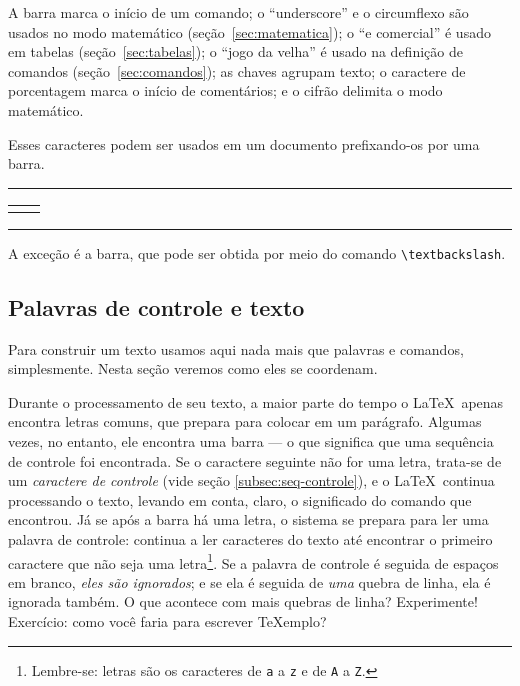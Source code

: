 A barra marca o início de um comando; o ``underscore'' e o circumflexo
são usados no modo matemático (seção~\ref{sec:matematica}); o ``e
comercial'' é usado em tabelas (seção~\ref{sec:tabelas}); o ``jogo da
velha'' é usado na definição de comandos (seção~\ref{sec:comandos});
as chaves agrupam texto; o caractere de porcentagem marca o início de
comentários; e o cifrão delimita o modo matemático.

Esses caracteres podem ser usados em um documento prefixando-os por
uma barra.

\medskip
\begin{center}\footnotesize\hrule\smallskip
\begin{tabular}{c|c}
\begin{minipage}{.465\textwidth}

\end{minipage} &
\begin{minipage}{.465\textwidth}
\centering 
\end{minipage}
\end{tabular}
\smallskip\hrule
\end{center}
\medskip

A exceção é a barra, que pode ser obtida  por meio do
comando \verb'\textbackslash'.

\subsection{Palavras de controle e texto}\label{sec:palavras-de-controle}

Para construir um texto usamos aqui nada mais que palavras e comandos,
simplesmente. Nesta seção veremos como eles se coordenam.

Durante o processamento de seu texto, a maior parte do tempo o
\LaTeX\ apenas encontra letras comuns, que prepara para colocar em um
parágrafo. Algumas vezes, no entanto, ele encontra uma barra --- o que
significa que uma sequência de controle foi encontrada. Se o caractere
seguinte não for uma letra, trata-se de um 
\emph{caractere de controle} (vide seção \ref{subsec:seq-controle}), e
o \LaTeX\ continua processando o texto, levando em conta, claro, o
significado do comando que encontrou. Já se após a barra há uma
letra, o sistema se prepara para ler uma palavra de controle: continua
a ler caracteres do texto até encontrar o primeiro caractere que não
seja uma letra\footnote{Lembre-se: letras são os caracteres de
  \texttt{a} a \texttt{z} e de \texttt{A} a \texttt{Z}.}. Se a palavra
de controle é seguida de espaços em branco, \emph{eles são
  ignorados}; e se ela é seguida de \emph{uma} quebra de linha, ela é
ignorada também. O que acontece com mais quebras de linha?
Experimente! Exercício: como você faria para escrever \TeX emplo?

